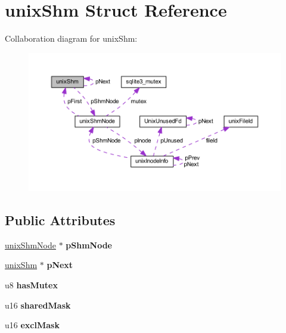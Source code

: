 \hypertarget{structunix_shm}{\section{unix\-Shm Struct Reference}
\label{structunix_shm}
}


Collaboration diagram for unix\-Shm\-:\nopagebreak
\begin{figure}[H]
\begin{center}
\leavevmode
\includegraphics[width=350pt]{structunix_shm__coll__graph}
\end{center}
\end{figure}
\subsection*{Public Attributes}
\begin{DoxyCompactItemize}
\item 
\hypertarget{structunix_shm_a8ab421232d29e3237262ef46775199ee}{\hyperlink{structunix_shm_node}{unix\-Shm\-Node} $\ast$ {\bfseries p\-Shm\-Node}}\label{structunix_shm_a8ab421232d29e3237262ef46775199ee}

\item 
\hypertarget{structunix_shm_a0d5229cf734581f51cdf16dd7d5ce93a}{\hyperlink{structunix_shm}{unix\-Shm} $\ast$ {\bfseries p\-Next}}\label{structunix_shm_a0d5229cf734581f51cdf16dd7d5ce93a}

\item 
\hypertarget{structunix_shm_a43903be262472299c5eee917ba7c523c}{u8 {\bfseries has\-Mutex}}\label{structunix_shm_a43903be262472299c5eee917ba7c523c}

\item 
\hypertarget{structunix_shm_a768aa62a6ea2bd91ab60a34d7654811b}{u16 {\bfseries shared\-Mask}}\label{structunix_shm_a768aa62a6ea2bd91ab60a34d7654811b}

\item 
\hypertarget{structunix_shm_ac6f786d95952e51cab941cbfb9243c8e}{u16 {\bfseries excl\-Mask}}\label{structunix_shm_ac6f786d95952e51cab941cbfb9243c8e}

\end{DoxyCompactItemize}



